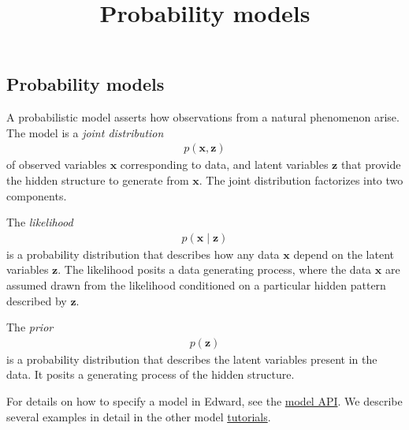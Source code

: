 \title{Probability models}

\subsection{Probability models}

A probabilistic model asserts how observations from a natural phenomenon arise.
The model is a \emph{joint distribution}
\begin{align*}
  p(\mathbf{x}, \mathbf{z})
\end{align*}
of observed variables $\mathbf{x}$ corresponding to data, and latent
variables $\mathbf{z}$ that provide the hidden structure to generate
from $\mathbf{x}$. The joint distribution factorizes into two
components.

The \emph{likelihood}
\begin{align*}
  p(\mathbf{x} \mid \mathbf{z})
\end{align*}
is a probability distribution that describes how any data $\mathbf{x}$
depend on the latent variables $\mathbf{z}$. The likelihood posits a
data generating process, where the data $\mathbf{x}$ are assumed drawn
from the likelihood conditioned on a particular hidden pattern
described by $\mathbf{z}$.

The \emph{prior}
\begin{align*}
  p(\mathbf{z})
\end{align*}
is a probability distribution that describes the latent variables
present in the data. It posits a generating process of the hidden structure.

For details on how to specify a model in Edward, see the
\href{/api/model}{model API}. We describe several examples in detail
in the
other model \href{/tutorials/}{tutorials}.
